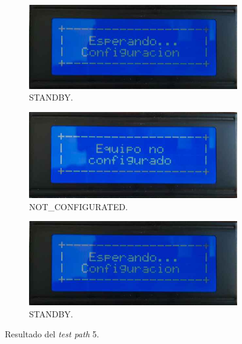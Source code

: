\begin{figure}[!htpb]
     \centering
     \begin{subfigure}[b]{0.4\textwidth}
         \centering
         \includegraphics[width=1.1\textwidth]{./Figures/Esp_Conf.jpeg}
         \caption{STANDBY.}
         \label{fig:pruConf_5_1}
     \end{subfigure}
           \hfill
     \begin{subfigure}[b]{0.4\textwidth}
         \centering
         \includegraphics[width=1.1\textwidth]{./Figures/Eq_no_conf.jpeg}
         \caption{NOT\_CONFIGURATED.}
         \label{fig:pruConf_5_2}
     \end{subfigure}
           \hfill
     \begin{subfigure}[b]{0.4\textwidth}
         \centering
         \includegraphics[width=1.1\textwidth]{./Figures/Esp_Conf.jpeg}
         \caption{STANDBY.}
         \label{fig:pruConf_5_3}
     \end{subfigure}
        \caption{Resultado del \textit{test path} 5.}
        \label{fig:pruConf_5_res}
\end{figure}

